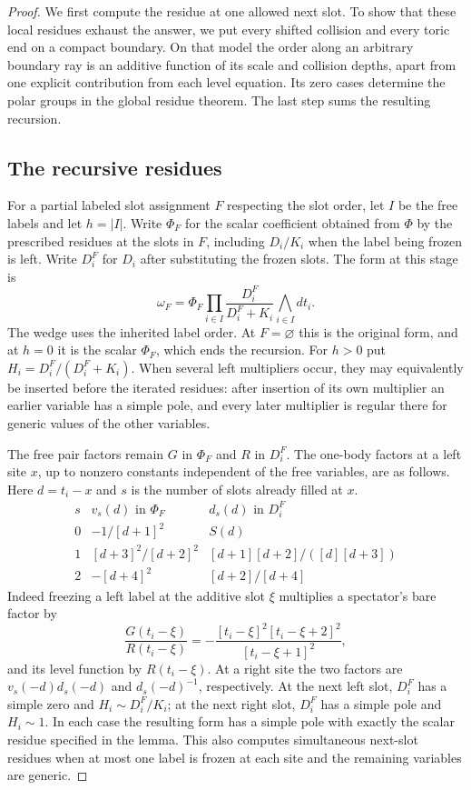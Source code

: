 \begin{proof}
We first compute the residue at one allowed next slot. To show that these local
residues exhaust the answer, we put every shifted collision and every toric
end on a compact boundary. On that model the order along an arbitrary
boundary ray is an additive function of its scale and collision depths,
apart from one explicit contribution from each level equation. Its zero
cases determine the polar groups in the global residue theorem. The last
step sums the resulting recursion.

\subsection{The recursive residues}

For a partial labeled slot assignment $F$ respecting the slot order, let $I$
be the free labels and let $h=|I|$. Write $\Phi_F$ for the scalar coefficient
obtained from $\Phi$ by the prescribed residues at the slots in $F$, including
$D_i/K_i$ when the label being frozen is left. Write $D_i^F$ for $D_i$ after
substituting the frozen slots. The form at this stage is
\begin{equation}\label{eq:recursive-form}
 \omega_F=\Phi_F\prod_{i\in I}\frac{D_i^F}{D_i^F+K_i}
                 \bigwedge_{i\in I}dt_i.
\end{equation}
The wedge uses the inherited label order. At $F=\varnothing$ this is the
original form, and at $h=0$ it is the scalar $\Phi_F$, which ends the
recursion. For $h>0$ put $H_i=D_i^F/(D_i^F+K_i)$. When several left
multipliers occur, they may equivalently be inserted before the iterated
residues: after insertion of its own multiplier an earlier variable has a
simple pole, and every later multiplier is regular there for generic values
of the other variables.

The free pair factors remain $G$ in $\Phi_F$ and $R$ in $D_i^F$. The
one-body factors at a left site $x$, up to nonzero constants independent of
the free variables, are as follows. Here $d=t_i-x$ and $s$ is the number of
slots already filled at $x$.
\[
 \begin{array}{c|cc}
 s&v_s(d)\text{ in }\Phi_F&d_s(d)\text{ in }D_i^F\\
 0&-1/[d+1]^2&S(d)\\
 1&[d+3]^2/[d+2]^2&[d+1][d+2]/([d][d+3])\\
 2&-[d+4]^2&[d+2]/[d+4]
 \end{array}
\]
Indeed freezing a left label at the additive slot $\xi$ multiplies a spectator's bare factor by
\[
 \frac{G(t_i-\xi)}{R(t_i-\xi)}
 =-\frac{[t_i-\xi]^2[t_i-\xi+2]^2}{[t_i-\xi+1]^2},
\]
and its level function by $R(t_i-\xi)$. At a right site the two factors are
$v_s(-d)d_s(-d)$ and $d_s(-d)^{-1}$, respectively. At the next left slot,
$D_i^F$ has a simple zero and $H_i\sim D_i^F/K_i$; at the next right slot,
$D_i^F$ has a simple pole and $H_i\sim1$. In each case the resulting form
has a simple pole with exactly the scalar residue specified in the lemma.
This also computes simultaneous next-slot residues when at most one label
is frozen at each site and the remaining variables are generic.


\end{proof}
